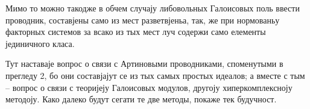 ﻿\documentclass[11pt]{article}
\begin{document}
Мимо то можно такодже в обчем случају либовольных Галоисовых поль ввести проводник, составјены само из мест разветвјеньа, так, же при нормованьу факторных системов за всако из тых мест луч содержи само елементы јединичного класа.

Тут наставаје вопрос о связи с Артиновыми проводниками, споменутыми в прегледу 2, бо они составјајут се из тых самых простых идеалов; а вместе с тым -- вопрос о связи с теоријеју Галоисовых модулов, другоју хиперкомплексноју методоју. Како далеко будут сегати те две методы, покаже тек будучност.
\end{document}
